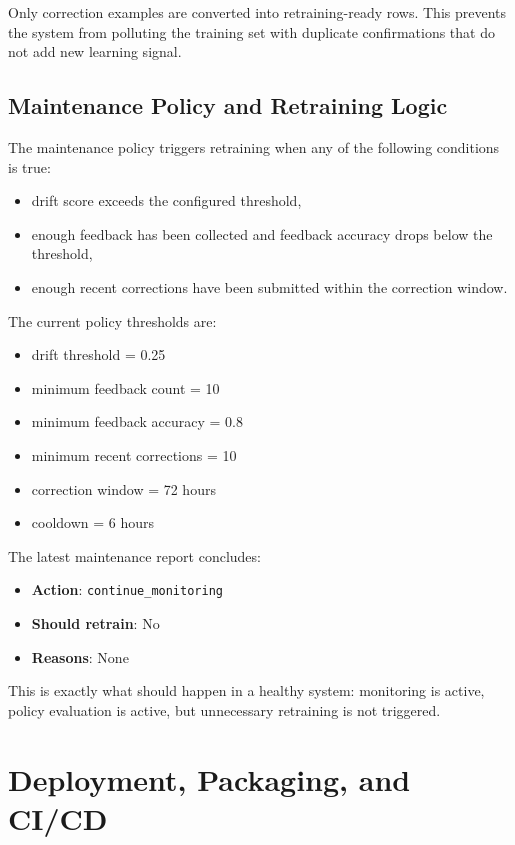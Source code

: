 \documentclass[11pt,a4paper]{article}
\newcommand{\smallmetric}[2]{\textbf{#1}: #2}
\begin{document}
Only correction examples are converted into retraining-ready rows. This prevents the system from polluting the training set with duplicate confirmations that do not add new learning signal.

\subsection{Maintenance Policy and Retraining Logic}

The maintenance policy triggers retraining when any of the following conditions is true:

\begin{itemize}[leftmargin=1.4em]
  \item drift score exceeds the configured threshold,
  \item enough feedback has been collected and feedback accuracy drops below the threshold,
  \item enough recent corrections have been submitted within the correction window.
\end{itemize}

The current policy thresholds are:

\begin{itemize}[leftmargin=1.4em]
  \item drift threshold = 0.25
  \item minimum feedback count = 10
  \item minimum feedback accuracy = 0.8
  \item minimum recent corrections = 10
  \item correction window = 72 hours
  \item cooldown = 6 hours
\end{itemize}

The latest maintenance report concludes:

\begin{itemize}[leftmargin=1.4em]
  \item \smallmetric{Action}{\texttt{continue\_monitoring}}
  \item \smallmetric{Should retrain}{No}
  \item \smallmetric{Reasons}{None}
\end{itemize}

This is exactly what should happen in a healthy system: monitoring is active, policy evaluation is active, but unnecessary retraining is not triggered.

\section{Deployment, Packaging, and CI/CD}
\end{document}

